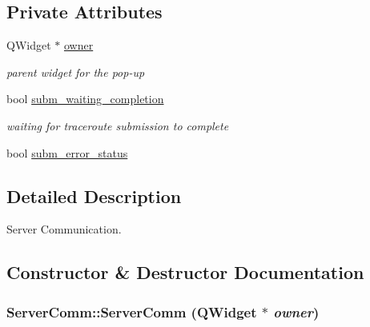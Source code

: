 \subsection*{Private Attributes}
\begin{CompactItemize}
\item 
\hypertarget{classServerComm_b54032885f5525793add53721382471e}{
QWidget $\ast$ \hyperlink{classServerComm_b54032885f5525793add53721382471e}{owner}}
\label{classServerComm_b54032885f5525793add53721382471e}

\begin{CompactList}\small\item\em parent widget for the pop-up \item\end{CompactList}\item 
\hypertarget{classServerComm_9f449f3b4a2de13957b5bded20ef3437}{
bool \hyperlink{classServerComm_9f449f3b4a2de13957b5bded20ef3437}{subm\_\-waiting\_\-completion}}
\label{classServerComm_9f449f3b4a2de13957b5bded20ef3437}

\begin{CompactList}\small\item\em waiting for traceroute submission to complete \item\end{CompactList}\item 
bool \hyperlink{classServerComm_060b1a2c01b923b17dc8d9d3236be5a1}{subm\_\-error\_\-status}
\end{CompactItemize}


\subsection{Detailed Description}
Server Communication. 

\subsection{Constructor \& Destructor Documentation}
\hypertarget{classServerComm_a8fadc823665d05f8c7d9f577e2c02d8}{
\subsubsection[ServerComm]{\setlength{\rightskip}{0pt plus 5cm}ServerComm::ServerComm (QWidget $\ast$ {\em owner})}}
\label{classServerComm_a8fadc823665d05f8c7d9f577e2c02d8}


